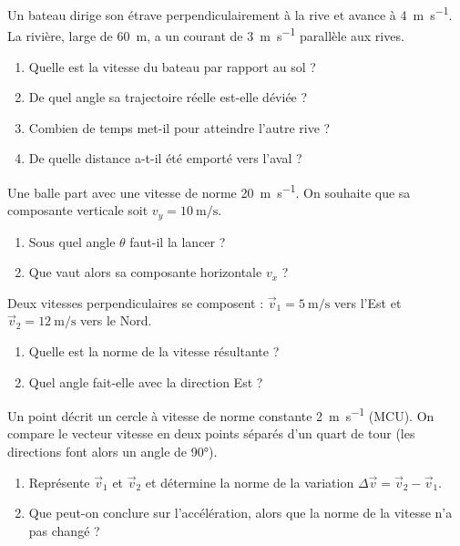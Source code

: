 \documentclass[11pt,a4paper]{article}
\newcommand{\vv}[1]{\vec{#1}}\newcommand{\ds}{\displaystyle}
\begin{document}

\begin{exo}
Un bateau dirige son étrave perpendiculairement à la rive et avance à \qty{4}{\metre\per\second}.
La rivière, large de \qty{60}{\metre}, a un courant de \qty{3}{\metre\per\second} parallèle aux rives.
\begin{enumerate}[label=\alph*)]
  \item Quelle est la vitesse du bateau par rapport au sol ?
  \item De quel angle sa trajectoire réelle est-elle déviée ?
  \item Combien de temps met-il pour atteindre l'autre rive ?
  \item De quelle distance a-t-il été emporté vers l'aval ?
\end{enumerate}
\end{exo}

\begin{exo}
Une balle part avec une vitesse de norme \qty{20}{\metre\per\second}. On souhaite que sa composante
verticale soit $v_y=\qty{10}{\metre\per\second}$.
\begin{enumerate}[label=\alph*)]
  \item Sous quel angle $\theta$ faut-il la lancer ?
  \item Que vaut alors sa composante horizontale $v_x$ ?
\end{enumerate}
\end{exo}

\begin{exo}
Deux vitesses perpendiculaires se composent : $\vv{v}_1=\qty{5}{\metre\per\second}$ vers l'Est et
$\vv{v}_2=\qty{12}{\metre\per\second}$ vers le Nord.
\begin{enumerate}[label=\alph*)]
  \item Quelle est la norme de la vitesse résultante ?
  \item Quel angle fait-elle avec la direction Est ?
\end{enumerate}
\end{exo}

\begin{exo}
Un point décrit un cercle à vitesse de norme constante \qty{2}{\metre\per\second} (MCU). On compare le
vecteur vitesse en deux points séparés d'un quart de tour (les directions font alors un angle de \ang{90}).
\begin{enumerate}[label=\alph*)]
  \item Représente $\vv{v}_1$ et $\vv{v}_2$ et détermine la norme de la variation $\Delta\vv{v}=\vv{v}_2-\vv{v}_1$.
  \item Que peut-on conclure sur l'accélération, alors que la norme de la vitesse n'a pas changé ?
\end{enumerate}
\end{exo}
\end{document}
